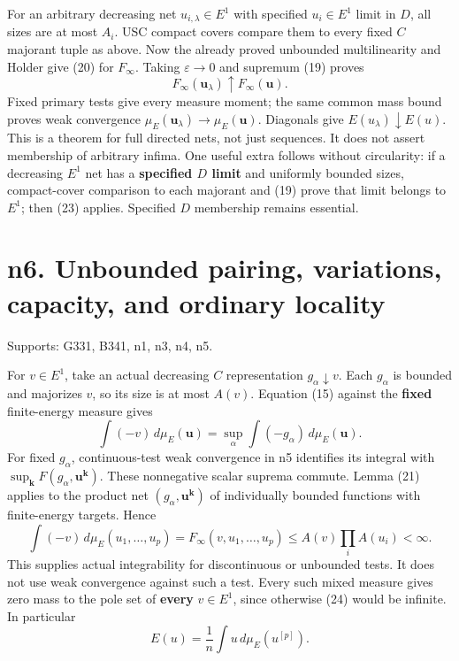 \documentclass[
  11pt,
]{article}
\begin{document}
For an arbitrary decreasing net \(u_{i,\lambda}\in E^1\) with specified
\(u_i\in E^1\) limit in \(D\), all sizes are at most \(A_i\). USC
compact covers compare them to every fixed \(C\) majorant tuple as
above. Now the already proved unbounded multilinearity and Holder give
(20) for \(F_\infty\). Taking \(\varepsilon\to0\) and supremum (19)
proves
\[F_\infty(\boldsymbol u_\lambda)\uparrow F_\infty(\boldsymbol u).\tag{23}\]
Fixed primary tests give every measure moment; the same common mass
bound proves weak convergence
\(\mu_E(\boldsymbol u_\lambda)\to\mu_E(\boldsymbol u)\). Diagonals give
\(E(u_\lambda)\downarrow E(u)\). This is a theorem for full directed
nets, not just sequences. It does not assert membership of arbitrary
infima. One useful extra follows without circularity: if a decreasing
\(E^1\) net has a \textbf{specified \(D\) limit} and uniformly bounded
sizes, compact-cover comparison to each majorant and (19) prove that
limit belongs to \(E^1\); then (23) applies. Specified \(D\) membership
remains essential.

\section{n6. Unbounded pairing, variations, capacity, and ordinary
locality}\label{n6.-unbounded-pairing-variations-capacity-and-ordinary-locality}

Supports: G331, B341, n1, n3, n4, n5.

For \(v\in E^1\), take an actual decreasing \(C\) representation
\(g_\alpha\downarrow v\). Each \(g_\alpha\) is bounded and majorizes
\(v\), so its size is at most \(A(v)\). Equation (15) against the
\textbf{fixed} finite-energy measure gives
\[\int(-v)\,d\mu_E(\boldsymbol u)=\sup_\alpha\int(-g_\alpha)\,d\mu_E(\boldsymbol u).\]
For fixed \(g_\alpha\), continuous-test weak convergence in n5
identifies its integral with
\(\sup_{\boldsymbol k}F(g_\alpha,\boldsymbol u^{\boldsymbol k})\). These
nonnegative scalar suprema commute. Lemma (21) applies to the product
net \((g_\alpha,\boldsymbol u^{\boldsymbol k})\) of individually bounded
functions with finite-energy targets. Hence
\[\int(-v)\,d\mu_E(u_1,\ldots,u_p)=F_\infty(v,u_1,\ldots,u_p)\le A(v)\prod_iA(u_i)<\infty.\tag{24}\]
This supplies actual integrability for discontinuous or unbounded tests.
It does not use weak convergence against such a test. Every such mixed
measure gives zero mass to the pole set of \textbf{every} \(v\in E^1\),
since otherwise (24) would be infinite. In particular
\[E(u)=\frac1n\int u\,d\mu_E(u^{[p]}).\tag{25}\]
\end{document}
